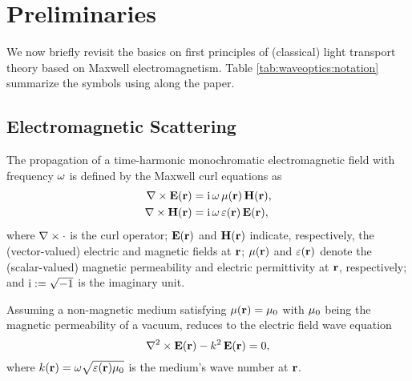 \section{Preliminaries}
\label{sec:waveoptics:prelim}

We now briefly revisit the basics on first principles of (classical) light transport theory based on Maxwell electromagnetism. Table \ref{tab:waveoptics:notation} summarize the symbols using along the paper.



\subsection{Electromagnetic Scattering}
\label{ssec:prelim_maxwells}

The propagation of a time-harmonic monochromatic electromagnetic field with frequency $\omega$ is defined by the Maxwell curl equations as
\begin{equation}
    \begin{aligned}
        \nabla\times\mathbf{E}(\mathbf{r}) &= \text{i}\,\omega\,\mu(\mathbf{r})\,\mathbf{H}(\mathbf{r}),\\
        \nabla\times\mathbf{H}(\mathbf{r}) &= \text{i}\,\omega\,\varepsilon(\mathbf{r})\,\mathbf{E}(\mathbf{r}),
    \end{aligned}
    \label{eq:maxwell}
\end{equation}
where $\nabla\times\cdot$ is the curl operator; $\mathbf{E}(\mathbf{r})$ and $\mathbf{H}(\mathbf{r})$ indicate, respectively, the (vector-valued) electric and magnetic fields at $\mathbf{r}$; $\mu(\mathbf{r})$ and $\varepsilon(\mathbf{r})$ denote the (scalar-valued) magnetic permeability and electric permittivity at $\mathbf{r}$, respectively; and $\text{i} := \sqrt{-1}$ is the imaginary unit.

Assuming a non-magnetic medium satisfying $\mu(\mathbf{r}) = \mu_0$ with $\mu_0$ being the magnetic permeability of a vacuum,  reduces to the electric field wave equation
\begin{equation}
    \nabla^2\times\mathbf{E}(\mathbf{r}) - k^2\,\mathbf{E}(\mathbf{r}) = 0,
    \label{eq:efieldwave}
\end{equation}
where $k(\mathbf{r}) = \omega\sqrt{\varepsilon(\mathbf{r})\mu_0}$ is the medium's wave number at $\mathbf{r}$. 

